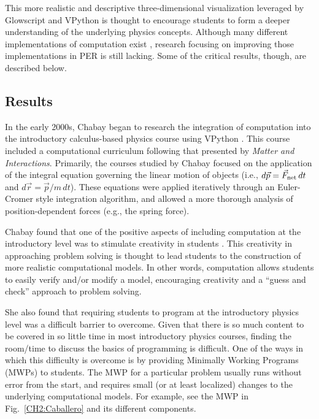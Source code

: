 \documentclass{msuphddissertation}
\begin{document}
\begin{doublespace}
This more realistic and descriptive three-dimensional visualization leveraged by Glowscript and VPython is thought to encourage students to form a deeper understanding of the underlying physics concepts.  Although many different implementations of computation exist \cite{Papert1972,DiSessa1986,Perkins2006,Chabay2008}, research focusing on improving those implementations in PER is still lacking.  Some of the critical results, though, are described below.

\subsection{Results}

In the early 2000s, Chabay began to research the integration of computation into the introductory calculus-based physics course using VPython \cite{Chabay2008}.  This course included a computational curriculum following that presented by \textit{Matter and Interactions}.  Primarily, the courses studied by Chabay focused on the application of the integral equation governing the linear motion of objects (i.e., $d\vec{p}=\vec{F}_{\rm net}\,dt$ and $d\vec{r}=\vec{p}/m\,dt$).  These equations were applied iteratively through an Euler-Cromer style integration algorithm, and allowed a more thorough analysis of position-dependent forces (e.g., the spring force).

Chabay found that one of the positive aspects of including computation at the introductory level was to stimulate creativity in students \cite{Chabay2008}.  This creativity in approaching problem solving is thought to lead students to the construction of more realistic computational models.  In other words, computation allows students to easily verify and/or modify a model, encouraging creativity and a ``guess and check'' approach to problem solving.

She also found that requiring students to program at the introductory physics level was a difficult barrier to overcome.  Given that there is so much content to be covered in so little time in most introductory physics courses, finding the room/time to discuss the basics of programming is difficult.  One of the ways in which this difficulty is overcome is by providing Minimally Working Programs (MWPs) to students.  The MWP for a particular problem usually runs without error from the start, and requires small (or at least localized) changes to the underlying computational models.  For example, see the MWP in Fig.~\ref{CH2:Caballero} and its different components.


\end{doublespace}
\end{document}
